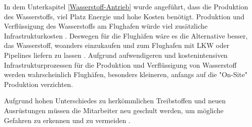 %
%

In dem Unterkapitel \ref{Wasserstoff-Antrieb} wurde angeführt, dass die Produktion des Wasserstoffs, 
viel Platz Energie und hohe Kosten benötigt. Produktion und Verflüssigung des Wasserstoffs am Flughafen würde viel zusätzliche Infrastrukturkosten \cite{dalmia2022powering}.
Deswegen für die Flughäfen wäre es die Alternative besser, das Wasserstoff, woanders einzukaufen und zum Flughafen 
mit LKW oder Pipelines liefern zu lassen \cite{gu2023hydrogen}.
Aufgrund aufwendigeren und kostenintensiven Infrastrukturprozessen für die Produktion und Verflüssigung von 
Wasserstoff werden wahrscheinlich Flughäfen, 
besonders kleineren, anfangs auf die "On-Site" Produktion verzichten.

Aufgrund hohen Unterschiedes zu herkömmlichen Treibstoffen und neuen Ausrüstungen müssen die Mitarbeiter neu geschult werden, 
um mögliche Gefahren zu erkennen und zu vermeiden \cite{gu2023hydrogen}.

